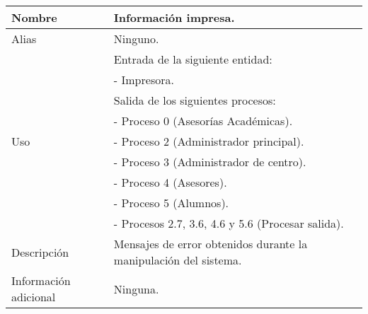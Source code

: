 \begin{center}
  \begin{tabular}{| l | p{9cm} |}
    \hline
    Nombre & \textbf{Información impresa}.\\
    \hline
    Alias & Ninguno.\\
    \hline
    \multirow{9}{*}{Uso} & Entrada de la siguiente entidad:\\
                         & - Impresora.\\
                         & Salida de los siguientes procesos:\\
                         & - Proceso 0 (Asesorías Académicas).\\
                         & - Proceso 2 (Administrador principal).\\
                         & - Proceso 3 (Administrador de centro).\\
                         & - Proceso 4 (Asesores).\\
                         & - Proceso 5 (Alumnos).\\
                         & - Procesos 2.7, 3.6, 4.6 y 5.6 (Procesar salida).\\
    \hline
    Descripción & Mensajes de error obtenidos durante la manipulación del
                  sistema.\\
    \hline
    Información adicional & Ninguna.\\
    \hline
  \end{tabular}
\end{center}
